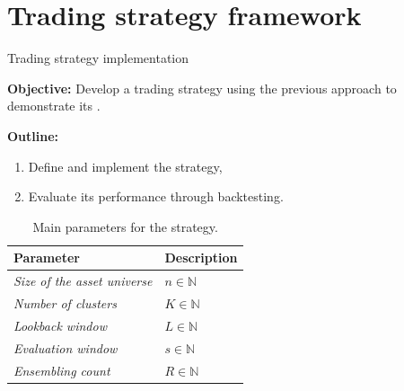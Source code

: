 \documentclass[dvipsnames,mathserif]{beamer}
\begin{document}
\section{Trading strategy framework}
\label{trading-strat}
\begin{frame}{Trading strategy implementation}

    \textbf{Objective:} Develop a trading strategy using the previous approach to demonstrate its .

    \centering 
    
\vfill 

    \textbf{Outline:}
    \begin{enumerate}
        \item Define and implement the strategy,
        \item Evaluate its performance through backtesting.
    \end{enumerate}

\vfill 

    \begin{table}[h]
    \centering
    \begin{tabular}{ll}
        \toprule
        \textbf{Parameter} & \textbf{Description} \\
        \midrule
        \textit{Size of the asset universe} & \( n \in \mathbb{N} \) \\
        \textit{Number of clusters} & \( K \in \mathbb{N} \) \\
        \textit{Lookback window} & \( L \in \mathbb{N} \) \\
        \textit{Evaluation window} & \( s \in \mathbb{N} \) \\
        \textit{Ensembling count} & \( R \in \mathbb{N} \) \\
        \bottomrule
    \end{tabular}
    \caption{Main parameters for the strategy.}
    \label{tab:parameters}
    \end{table}

\end{frame}
\end{document}
